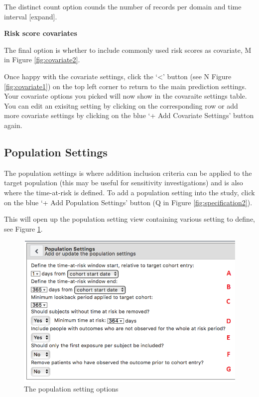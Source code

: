 \documentclass[11pt]{book}
\theoremstyle{definition}
\theoremstyle{definition}
\theoremstyle{definition}
\theoremstyle{remark}
\begin{document}
The distinct count option counds the number of records per domain and time interval {[}expand{]}.

\textbf{Risk score covariates}

The final option is whether to include commonly used risk scores as covariate, M in Figure \ref{fig:covariate2}.

Once happy with the covariate settings, click the `\textless{}' button (see N Figure \ref{fig:covariate1}) on the top left corner to return to the main prediction settings. Your covariate options you picked will now show in the covaraite settings table. You can edit an exisitng setting by clicking on the corresponding row or add more covariate settings by clicking on the blue `+ Add Covariate Settings' button again.

\hypertarget{population-settings}{%
\subsection{Population Settings}\label{population-settings}}

The population settings is where addition inclusion criteria can be applied to the target population (this may be useful for sensitivity investigations) and is also where the time-at-risk is defined. To add a population setting into the study, click on the blue `+ Add Population Settings' button (Q in Figure \ref{fig:specification2}).

This will open up the population setting view containing various setting to define, see Figure \ref{fig:figureAS19}.

\begin{figure}
\includegraphics[width=1\linewidth]{images/PatientLevelPrediction/atlasImplementation/analysis_population_settings} \caption{The population setting options}\label{fig:figureAS19}
\end{figure}
\end{document}
